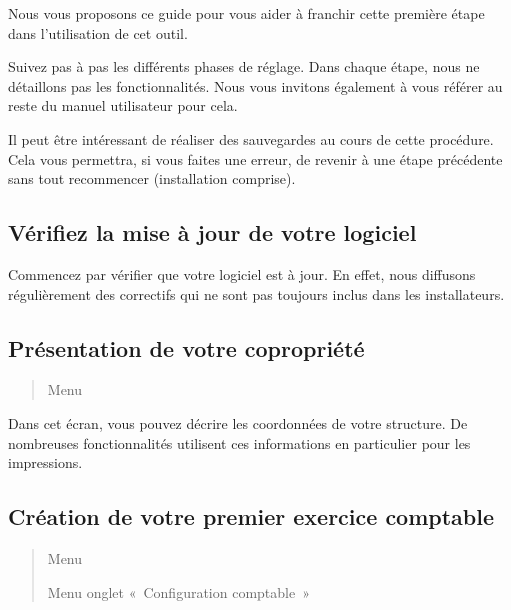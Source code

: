 \documentclass[a4paper,10pt,oneside,french]{sphinxmanual}
\begin{document}
Nous vous proposons ce guide pour vous aider à franchir cette première étape dans l’utilisation de cet outil.

Suivez pas à pas les différents phases de réglage. Dans chaque étape, nous ne détaillons pas les fonctionnalités. Nous vous invitons également à vous référer au reste du manuel utilisateur pour cela.

Il peut être intéressant de réaliser des sauvegardes au cours de cette procédure.
Cela vous permettra, si vous faites une erreur, de revenir à une étape précédente sans tout recommencer (installation comprise).


\subsection{Vérifiez la mise à jour de votre logiciel}
\label{\detokenize{syndic/first_step:verifiez-la-mise-a-jour-de-votre-logiciel}}
Commencez par vérifier que votre logiciel est à jour.
En effet, nous diffusons régulièrement des correctifs qui ne sont pas toujours inclus dans les installateurs.


\subsection{Présentation de votre copropriété}
\label{\detokenize{syndic/first_step:presentation-de-votre-copropriete}}\begin{quote}

Menu 
\end{quote}

Dans cet écran, vous pouvez décrire les coordonnées de votre structure.
De nombreuses fonctionnalités utilisent ces informations en particulier pour les impressions.


\subsection{Création de votre premier exercice comptable}
\label{\detokenize{syndic/first_step:creation-de-votre-premier-exercice-comptable}}\begin{quote}

Menu 

Menu  \sphinxhyphen{} onglet « Configuration comptable »
\end{quote}
\end{document}
